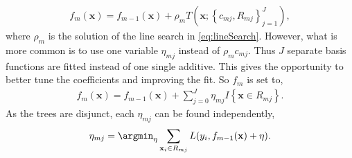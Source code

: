 \begin{align}
  f_m(\mathbf{x}) = f_{m-1}(\mathbf{x}) + \rho_m T(\mathbf{x}; \left\{ c_{m j}, R_{m j} \right\}_{j=1}^{J}),
\end{align}
where $\rho_m$ is the solution of the line search in \eqref{eq:lineSearch}.  However, what is more common is to use one variable $\eta_{m j}$ instead of $\rho_m c_{m j}$. Thus $J$ separate basis functions are fitted instead of one single additive. This gives the opportunity to better tune the coefficients and improving the fit. So $f_m$ is set to,
\begin{align}
  \label{eq:etaLineSearch} 
  f_m(\mathbf{x}) = f_{m-1}(\mathbf{x}) +  \sum^{J}_{j=0} \eta_{m j} I\left\{ \mathbf{x} \in R_{m j} \right\}.
\end{align}
As the trees are disjunct, each $\eta_{m j}$ can be found independently,
\begin{align}
  \eta_{m j} = \argmin_\eta  \sum_{\mathbf{x}_i \in R_{m j}} L(y_i, f_{m-1}(\mathbf{x}) + \eta).
\end{align}

